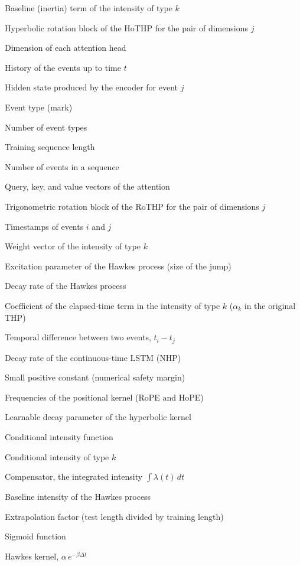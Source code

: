 
\begin{simbolos} \itemsep -1pt
	\item[$ b_k $] Baseline (inertia) term of the intensity of type $k$
	\item[$ \mathbf{B}_j $] Hyperbolic rotation block of the HoTHP for the pair of dimensions $j$
	\item[$ d $] Dimension of each attention head
	\item[$ \mathcal{H}_t $] History of the events up to time $t$
	\item[$ \mathbf{h}(t_j) $] Hidden state produced by the encoder for event $j$
	\item[$ k $] Event type (mark)
	\item[$ K $] Number of event types
	\item[$ L $] Training sequence length
	\item[$ N $] Number of events in a sequence
	\item[$ \mathbf{q}, \mathbf{k}, \mathbf{v} $] Query, key, and value vectors of the attention
	\item[$ \mathbf{R}_j $] Trigonometric rotation block of the RoTHP for the pair of dimensions $j$
	\item[$ t_i, t_j $] Timestamps of events $i$ and $j$
	\item[$ \mathbf{w}_k $] Weight vector of the intensity of type $k$
	\item[$ \alpha $] Excitation parameter of the Hawkes process (size of the jump)
	\item[$ \beta $] Decay rate of the Hawkes process
	\item[$ \gamma_k $] Coefficient of the elapsed-time term in the intensity of type $k$ ($\alpha_k$ in the original THP)
	\item[$ \Delta t $] Temporal difference between two events, $t_i - t_j$
	\item[$ \delta $] Decay rate of the continuous-time LSTM (NHP)
	\item[$ \epsilon $] Small positive constant (numerical safety margin)
	\item[$ \theta_j $] Frequencies of the positional kernel (RoPE and HoPE)
	\item[$ \theta' $] Learnable decay parameter of the hyperbolic kernel
	\item[$ \lambda(t \mid \mathcal{H}_t) $] Conditional intensity function
	\item[$ \lambda_k $] Conditional intensity of type $k$
	\item[$ \Lambda $] Compensator, the integrated intensity $\int \lambda(t)\,dt$
	\item[$ \mu $] Baseline intensity of the Hawkes process
	\item[$ \rho $] Extrapolation factor (test length divided by training length)
	\item[$ \sigma $] Sigmoid function
	\item[$ \varphi(\Delta t) $] Hawkes kernel, $\alpha\, e^{-\beta \Delta t}$
\end{simbolos}
